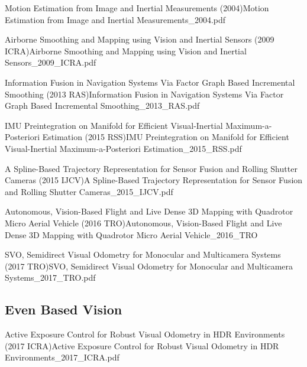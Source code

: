 \documentclass[10pt,a4paper]{scrartcl}
\begin{document}
\begin{multicols*}{2}
\begin{Paper}{Motion Estimation from Image and Inertial Measurements (2004)}{Motion Estimation from Image and Inertial Measurements_2004.pdf}
\end{Paper}

\begin{Paper}{Airborne Smoothing and Mapping using Vision and Inertial Sensors (2009 ICRA)}{Airborne Smoothing and Mapping using Vision and Inertial Sensors_2009_ICRA.pdf}
\end{Paper}

\begin{Paper}{Information Fusion in Navigation Systems Via Factor Graph Based Incremental Smoothing (2013 RAS)}{Information Fusion in Navigation Systems Via Factor Graph Based Incremental Smoothing_2013_RAS.pdf}
\end{Paper}

\begin{Paper}{IMU Preintegration on Manifold for Efficient Visual-Inertial Maximum-a-Posteriori Estimation (2015 RSS)}{IMU Preintegration on Manifold for Efficient Visual-Inertial Maximum-a-Posteriori Estimation_2015_RSS.pdf}
\end{Paper}

\begin{Paper}{A Spline-Based Trajectory Representation for Sensor Fusion and Rolling Shutter Cameras (2015 IJCV)}{A Spline-Based Trajectory Representation for Sensor Fusion and Rolling Shutter Cameras_2015_IJCV.pdf}
\end{Paper}

\begin{Paper}{Autonomous, Vision-Based Flight and Live Dense 3D Mapping with Quadrotor Micro Aerial Vehicle (2016 TRO)}{Autonomous, Vision-Based Flight and Live Dense 3D Mapping with Quadrotor Micro Aerial Vehicle_2016_TRO}
\end{Paper}

\begin{Paper}{SVO, Semidirect Visual Odometry for Monocular and Multicamera Systems (2017 TRO)}{SVO, Semidirect Visual Odometry for Monocular and Multicamera Systems_2017_TRO.pdf}
\end{Paper}

\subsection{Even Based Vision}

\begin{Paper}{Active Exposure Control for Robust Visual Odometry in HDR Environments (2017 ICRA)}{Active Exposure Control for Robust Visual Odometry in HDR Environments_2017_ICRA.pdf}
\end{Paper}


\end{multicols*}
\end{document}
